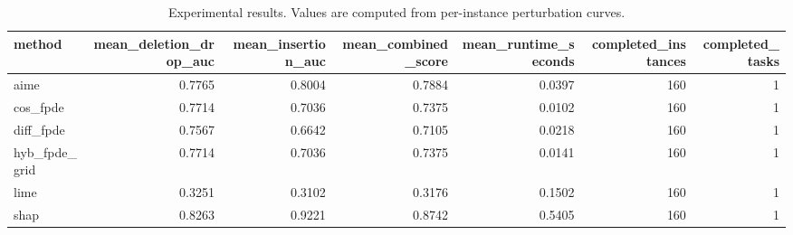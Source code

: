 \begin{table}[t]
\caption{Experimental results. Values are computed from per-instance perturbation curves.}
\label{tab:main_results_computed}
\centering
\begin{tabular}{lrrrrrr}
\toprule
method & mean\_deletion\_drop\_auc & mean\_insertion\_auc & mean\_combined\_score & mean\_runtime\_seconds & completed\_instances & completed\_tasks \\
\midrule
aime & 0.7765 & 0.8004 & 0.7884 & 0.0397 & 160 & 1 \\
cos\_fpde & 0.7714 & 0.7036 & 0.7375 & 0.0102 & 160 & 1 \\
diff\_fpde & 0.7567 & 0.6642 & 0.7105 & 0.0218 & 160 & 1 \\
hyb\_fpde\_grid & 0.7714 & 0.7036 & 0.7375 & 0.0141 & 160 & 1 \\
lime & 0.3251 & 0.3102 & 0.3176 & 0.1502 & 160 & 1 \\
shap & 0.8263 & 0.9221 & 0.8742 & 0.5405 & 160 & 1 \\
\bottomrule
\end{tabular}

\end{table}
